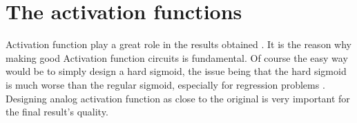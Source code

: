 \section{The activation functions}
\label{sec:af}

Activation function play a great role in the results obtained \cite{af}. It is the reason why making good Activation function circuits is fundamental. Of course the easy way would be to simply design a hard sigmoid, the issue being that the hard sigmoid is much worse than the regular sigmoid, especially for regression problems \cite{hardSigm}.
Designing analog activation function as close to the original is very important for the final result's quality.

